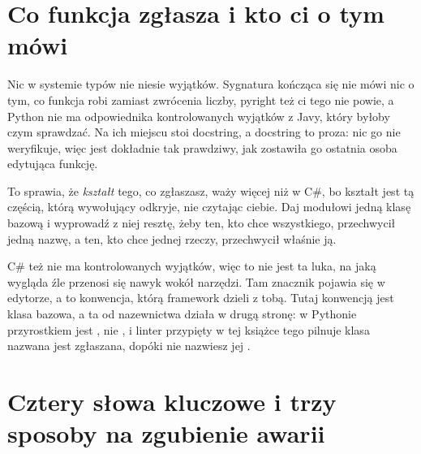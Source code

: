 \section{Co funkcja zgłasza i kto ci o tym mówi}
\label{sec:ch06-contract}

Nic w systemie typów nie niesie wyjątków. Sygnatura kończąca się
 nie mówi nic o tym, co funkcja robi zamiast zwrócenia liczby,
pyright też ci tego nie powie, a Python nie ma odpowiednika kontrolowanych
wyjątków z Javy, który byłoby czym sprawdzać. Na ich miejscu stoi docstring,
a docstring to proza: nic go nie weryfikuje, więc jest dokładnie tak
prawdziwy, jak zostawiła go ostatnia osoba edytująca funkcję.


\noindent
To sprawia, że \emph{kształt} tego, co zgłaszasz, waży więcej niż w C\#, bo
kształt jest tą częścią, którą wywołujący odkryje, nie czytając ciebie. Daj
modułowi jedną klasę bazową i wyprowadź z niej resztę, żeby ten, kto chce
wszystkiego, przechwycił jedną nazwę, a ten, kto chce jednej rzeczy,
przechwycił właśnie ją.


\begin{csbox}
C\# też nie ma kontrolowanych wyjątków, więc to nie jest ta luka, na jaką
wygląda \dash{} źle przenosi się nawyk wokół narzędzi. Tam znacznik
 pojawia się w edytorze, a
 to konwencja, którą framework dzieli z tobą.
Tutaj konwencją jest klasa bazowa, a ta od nazewnictwa działa w drugą stronę:
w Pythonie przyrostkiem jest , nie , i linter
przypięty w tej książce tego pilnuje \dash{} klasa nazwana
 jest zgłaszana, dopóki nie nazwiesz jej
.
\end{csbox}

\section{Cztery słowa kluczowe i trzy sposoby na zgubienie awarii}
\label{sec:ch06-keywords}

